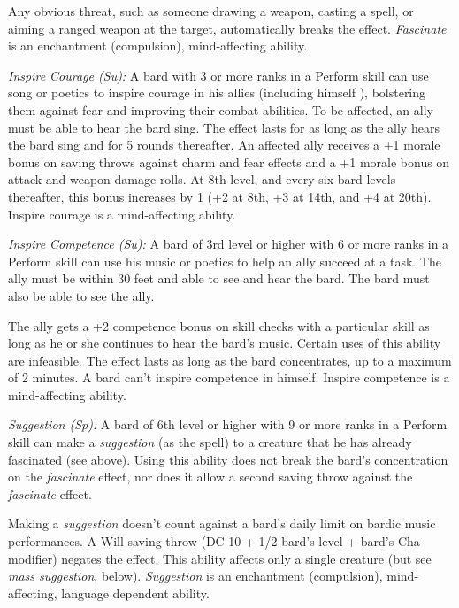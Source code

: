 \documentclass{article}
\begin{document}
Any obvious threat, such as someone drawing a weapon, casting a spell, or aiming 
a ranged weapon at the target, automatically breaks the effect. \textit{Fascinate 
}is an enchantment (compulsion), mind-affecting ability.

\textit{Inspire Courage (Su): }A bard with 3 or more ranks in a Perform skill can 
use song or poetics to inspire courage in his allies (including himself ), bolstering 
them against fear and improving their combat abilities. To be affected, an ally 
must be able to hear the bard sing. The effect lasts for as long as the ally hears 
the bard sing and for 5 rounds thereafter. An affected ally receives a +1 morale 
bonus on saving throws against charm and fear effects and a +1 morale bonus on 
attack and weapon damage rolls. At 8th level, and every six bard levels thereafter, 
this bonus increases by 1 (+2 at 8th, +3 at 14th, and +4 at 20th). Inspire courage 
is a mind-affecting ability.

\textit{Inspire Competence (Su): }A bard of 3rd level or higher with 6 or more 
ranks in a Perform skill can use his music or poetics to help an ally succeed at 
a task. The ally must be within 30 feet and able to see and hear the bard. The 
bard must also be able to see the ally.

The ally gets a +2 competence bonus on skill checks with a particular skill as 
long as he or she continues to hear the bard's music. Certain uses of this ability 
are infeasible. The effect lasts as long as the bard concentrates, up to a maximum 
of 2 minutes. A bard can't inspire competence in himself. Inspire competence is 
a mind-affecting ability.

\textit{Suggestion (Sp): }A bard of 6th level or higher with 9 or more ranks in 
a Perform skill can make a \textit{suggestion }(as the spell) to a creature that 
he has already fascinated (see above). Using this ability does not break the bard's 
concentration on the \textit{fascinate }effect, nor does it allow a second saving 
throw against the \textit{fascinate }effect.

Making a \textit{suggestion }doesn't count against a bard's daily limit on bardic 
music performances. A Will saving throw (DC 10 + 1/2 bard's level + bard's Cha 
modifier) negates the effect. This ability affects only a single creature (but 
see \textit{mass suggestion}, below). \textit{Suggestion }is an enchantment (compulsion), 
mind-affecting, language dependent ability.
\end{document}

